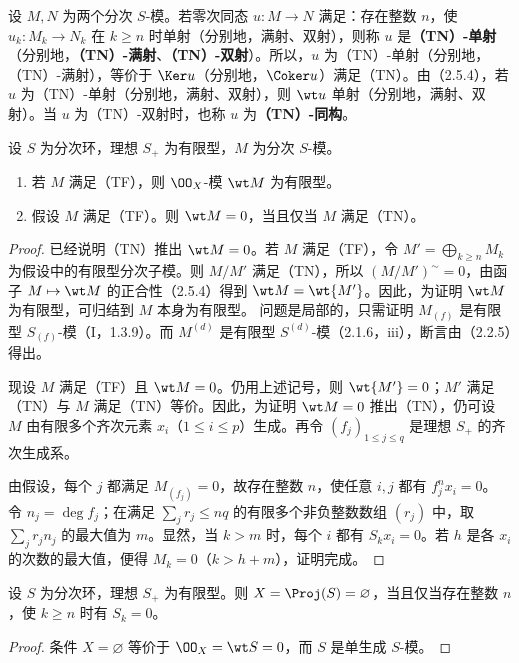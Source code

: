 设 $M,N$ 为两个分次 $S$-模。若零次同态 $u:M\to N$ 满足：存在整数 $n$，使
$u_k:M_k\to N_k$ 在 $k\geq n$ 时单射（分别地，满射、双射），则称 $u$ 是\textbf{（TN）-单射}（分别地，\textbf{（TN）-满射}、\textbf{（TN）-双射}）。所以，$u$ 为（TN）-单射（分别地，（TN）-满射），等价于 $\Ker u$（分别地，$\Coker u$）满足（TN）。由（2.5.4），若 $u$ 为（TN）-单射（分别地，满射、双射），则 $\wt u$ 单射（分别地，满射、双射）。当 $u$ 为（TN）-双射时，也称 $u$ 为\textbf{（TN）-同构}。

设 $S$ 为分次环，理想 $S_+$ 为有限型，$M$ 为分次 $S$-模。
\begin{enumerate}[label=(\roman*)]
\item 若 $M$ 满足（TF），则 $\OO_X$-模 $\wt M$ 为有限型。
\item 假设 $M$ 满足（TF）。则 $\wt M=0$，当且仅当 $M$ 满足（TN）。
\end{enumerate}
\begin{proof}
已经说明（TN）推出 $\wt M=0$。若 $M$ 满足（TF），令
$M'=\bigoplus_{k\geq n}M_k$ 为假设中的有限型分次子模。则 $M/M'$ 满足（TN），所以
$(M/M')^\sim=0$，由函子 $M\mapsto\wt M$ 的正合性（2.5.4）得到
$\wt M=\wt{M'}$。因此，为证明 $\wt M$ 为有限型，可归结到 $M$ 本身为有限型。
问题是局部的，只需证明 $M_{(f)}$ 是有限型 $S_{(f)}$-模（I，1.3.9）。而 $M^{(d)}$ 是有限型 $S^{(d)}$-模（2.1.6，iii），断言由（2.2.5）得出。

现设 $M$ 满足（TF）且 $\wt M=0$。仍用上述记号，则 $\wt{M'}=0$；$M'$ 满足（TN）与 $M$ 满足（TN）等价。因此，为证明 $\wt M=0$ 推出（TN），仍可设 $M$ 由有限多个齐次元素 $x_i$（$1\leq i\leq p$）生成。再令
$(f_j)_{1\leq j\leq q}$ 是理想 $S_+$ 的齐次生成系。

由假设，每个 $j$ 都满足 $M_{(f_j)}=0$，故存在整数 $n$，使任意 $i,j$ 都有 $f_j^nx_i=0$。
令 $n_j=\deg f_j$；在满足 $\sum_jr_j\leq nq$ 的有限多个非负整数数组 $(r_j)$ 中，取
$\sum_jr_jn_j$ 的最大值为 $m$。显然，当 $k>m$ 时，每个 $i$ 都有 $S_kx_i=0$。若 $h$ 是各 $x_i$ 的次数的最大值，便得 $M_k=0$（$k>h+m$），证明完成。
\end{proof}

设 $S$ 为分次环，理想 $S_+$ 为有限型。则 $X=\Proj(S)=\varnothing$，当且仅当存在整数 $n$，使 $k\geq n$ 时有 $S_k=0$。
\begin{proof}
条件 $X=\varnothing$ 等价于 $\OO_X=\wt S=0$，而 $S$ 是单生成 $S$-模。
\end{proof}

